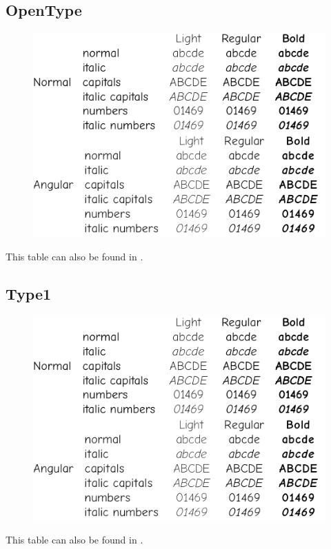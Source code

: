\documentclass[10pt,a4paper,english,twocolumn]{article}
\begin{document}
\subsection{OpenType}
\begin{figure}[ht]
	\centering
	\includegraphics[width=.7\textwidth]{comicneue-otf-specimen}
\end{figure}
This table can also be found in .

\subsection{Type1}
\begin{figure}[ht]
	\centering
	\includegraphics[width=.7\textwidth]{comicneue-type1-specimen}
\end{figure}
This table can also be found in .
\end{document}
